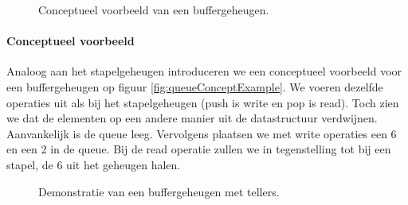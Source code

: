 \begin{figure}[hbt]
\centering
{}
\caption{Conceptueel voorbeeld van een buffergeheugen.}
\end{figure}
\paragraph{Conceptueel voorbeeld}
Analoog aan het stapelgeheugen introduceren we een conceptueel voorbeeld voor een buffergeheugen op figuur \ref{fig:queueConceptExample}. We voeren dezelfde operaties uit als bij het stapelgeheugen (push is write en pop is read). Toch zien we dat de elementen op een andere manier uit de datastructuur verdwijnen. Aanvankelijk is de queue leeg. Vervolgens plaatsen we met write operaties een 6 en een 2 in de queue. Bij de read operatie zullen we in tegenstelling tot bij een stapel, de 6 uit het geheugen halen.
\begin{figure}[hbt]
\centering
{}
\caption{Demonstratie van een buffergeheugen met tellers.}
\end{figure}
